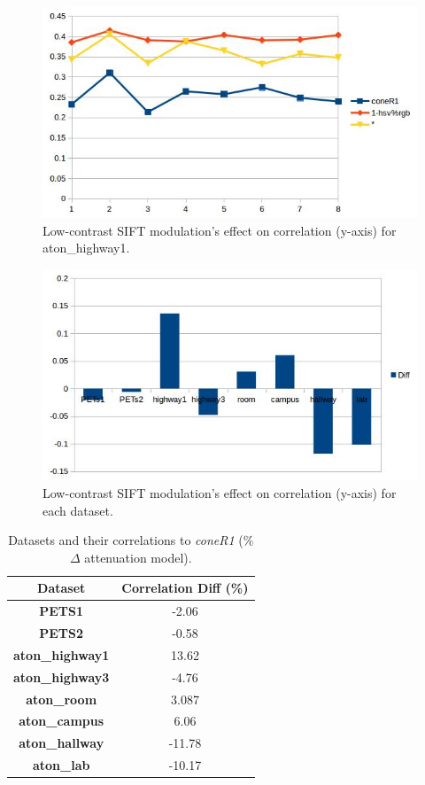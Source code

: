 \documentclass[12pt]{report}
\begin{document}
\begin{figure}
  \includegraphics[width=1\linewidth]{figures/highway1_sift.jpg}
\caption{Low-contrast SIFT modulation's effect on correlation (y-axis) for aton\_highway1.}
\label{fig:highway1_sift}
\end{figure}

\begin{figure}
  \includegraphics[width=1\linewidth]{figures/sift_correlation_diff.jpg}
\caption{Low-contrast SIFT modulation's effect on correlation (y-axis) for each dataset.}
\label{fig:corr_diff_sift}
\end{figure}

\begin{table}
\centering
\begin{tabular}{ |c|c| }
	\hline
	\textbf{Dataset} & Correlation Diff (\%) \\
	\hline
	\hline
	\textbf{PETS1} &  -2.06 \\
	\hline
	\textbf{PETS2} & -0.58 \\
	\hline
	\textbf{aton\_highway1} &  13.62 \\
	\hline
	\textbf{aton\_highway3} & -4.76  \\
	\hline
	\textbf{aton\_room} & 3.087 \\
	\hline
	\textbf{aton\_campus} & 6.06 \\
	\hline
	\textbf{aton\_hallway} & -11.78 \\
	\hline
	\textbf{aton\_lab} & -10.17 \\
	\hline
\end{tabular}
\caption{Datasets and their correlations to \textit{coneR1} (\%$\Delta$ attenuation model).}
\label{table:corr_diff_sift}
\end{table}
\end{document}
